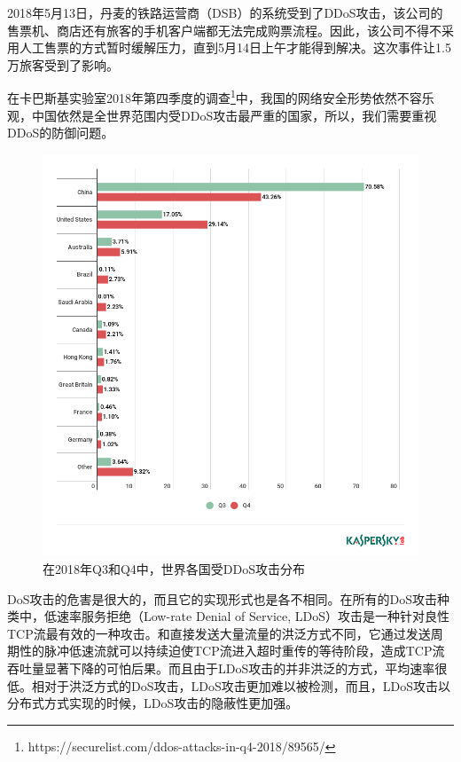 2018年5月13日，丹麦的铁路运营商（DSB）的系统受到了DDoS攻击，该公司的售票机、商店还有旅客的手机客户端都无法完成购票流程。因此，该公司不得不采用人工售票的方式暂时缓解压力，直到5月14日上午才能得到解决。这次事件让1.5万旅客受到了影响。

在卡巴斯基实验室2018年第四季度的调查\footnote{https://securelist.com/ddos-attacks-in-q4-2018/89565/}中，我国的网络安全形势依然不容乐观，中国依然是全世界范围内受DDoS攻击最严重的国家，所以，我们需要重视DDoS的防御问题。

\begin{figure}
    \centering
    \includegraphics[scale=0.5]{figures/en-ddos-by-countries.png}
    \caption{在2018年Q3和Q4中，世界各国受DDoS攻击分布}
    \label{fig:ddos_countries}
\end{figure}

DoS攻击的危害是很大的，而且它的实现形式也是各不相同。在所有的DoS攻击种类中，低速率服务拒绝（Low-rate Denial of Service, LDoS）攻击\cite{LDoS}是一种针对良性TCP流最有效的一种攻击。和直接发送大量流量的洪泛方式不同，它通过发送周期性的脉冲低速流就可以持续迫使TCP流进入超时重传的等待阶段，造成TCP流吞吐量显著下降的可怕后果。而且由于LDoS攻击的并非洪泛的方式，平均速率很低。相对于洪泛方式的DoS攻击，LDoS攻击更加难以被检测，而且，LDoS攻击以分布式方式实现的时候，LDoS攻击的隐蔽性更加强。

